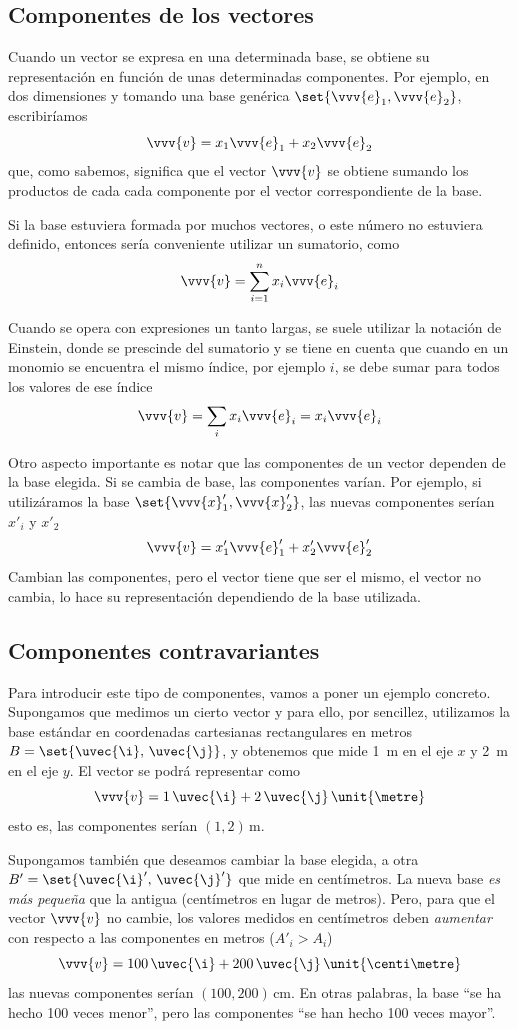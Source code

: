 \subsection{Componentes de los vectores}
Cuando un vector se expresa en una determinada base, se obtiene su representación en
función de unas determinadas componentes. Por ejemplo, en dos dimensiones y tomando una
base genérica $\set{\vvv{e}_1,\vvv{e}_2}$, escribiríamos
\[
  \vvv{v} = x_1\vvv{e}_1 + x_2\vvv{e}_2
\]
que, como sabemos, significa que el vector $\vvv{v}$ se obtiene sumando los productos de
cada cada componente por el vector correspondiente de la base.

Si la base estuviera formada por muchos vectores, o este número no estuviera definido,
entonces sería conveniente utilizar un sumatorio, como
\[
  \vvv{v} = \sum_{i=1}^n x_i\vvv{e}_i
\]

Cuando se opera con expresiones un tanto largas, se suele utilizar la notación de
Einstein, donde se prescinde del sumatorio y se tiene en cuenta que cuando en un
monomio se encuentra el mismo índice, por ejemplo $i$, se debe sumar para todos los
valores de ese índice
\[
  \vvv{v} = \sum_i x_i\vvv{e}_i = x_i \vvv{e}_i
\]

Otro aspecto importante es notar que las componentes de un vector dependen de la base
elegida. Si se cambia de base, las componentes varían. Por ejemplo, si utilizáramos
la base $\set{\vvv{x}'_1, \vvv{x}'_2}$, las nuevas componentes serían $x'_i$ y $x'_2$
\[ 
  \vvv{v} = x'_1\vvv{e}'_1 + x'_2\vvv{e}'_2
\]
Cambian las componentes, pero el vector tiene que ser el mismo, el vector no cambia, lo
hace su representación dependiendo de la base utilizada.

\subsection{Componentes contravariantes}
\label{ssect:R2-contravariantes}
Para introducir este tipo de componentes, vamos a poner un ejemplo concreto. Supongamos
que medimos un cierto vector y para ello, por sencillez, utilizamos la base estándar en coordenadas cartesianas rectangulares en metros $B=\set{\uvec{\i},\,\uvec{\j}}$, y
obtenemos que mide \qty{1}{\metre} en el eje $x$ y \qty{2}{\metre} en el eje $y$.
El vector se podrá representar como
\[
  \vvv{v} = 1\,\uvec{\i} + 2\,\uvec{\j}\,\unit{\metre}
\]
esto es, las componentes serían $(1, 2)\,\unit{\metre}$.

Supongamos también que deseamos cambiar la base elegida, a otra
$B' = \set{\uvec{\i}',\, \uvec{\j}'}$ que mide en centímetros. La nueva base
\emph{es más pequeña} que la antigua (centímetros en lugar de metros). Pero, para que el vector $\vvv{v}$ no cambie, los valores medidos en centímetros deben
\emph{aumentar} con respecto a las componentes en metros ($A'_i > A_i$)
\[
  \vvv{v} = 100\,\uvec{\i} + 200\,\uvec{\j}\,\unit{\centi\metre}
\]
las nuevas componentes serían $(100, 200)\,\unit{\centi\metre}$.
En otras palabras, la base ``se ha hecho 100 veces menor'', pero las componentes
``se han hecho 100 veces mayor''.

